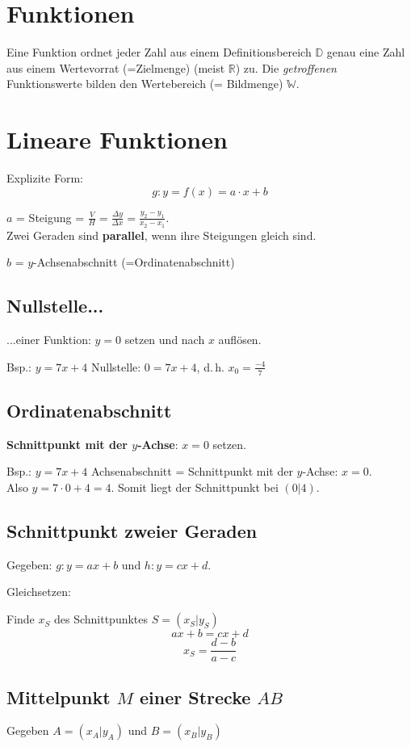 \begin{multicols}{2}
\hrulefill
\section{Funktionen}

Eine Funktion ordnet jeder Zahl aus einem Definitionsbereich
$\mathbb{D}$ genau eine Zahl aus einem Wertevorrat (=Zielmenge) (meist
$\mathbb{R}$)
zu. Die \textit{getroffenen} Funktionswerte bilden den Wertebereich
(= Bildmenge) $\mathbb{W}$.

\hrulefill
\section{Lineare Funktionen}
Explizite Form:
$$g: y = f(x) = a\cdot{}x + b$$

$a$ = Steigung = $\frac{V}{H}=\frac{\Delta y}{\Delta x} = \frac{y_2-y_1}{x_2-x_1}$.\\
Zwei Geraden sind \textbf{parallel}, wenn ihre Steigungen gleich sind.

$b$ = $y$-Achsenabschnitt (=Ordinatenabschnitt)


\subsection{Nullstelle...} ...einer Funktion: $y=0$ setzen und nach $x$
auf\/lösen.

Bsp.: $y=7x+4$ Nullstelle: $0 = 7x+4$, d.\,h. $x_0=\frac{-4}{7}$

\subsection{Ordinatenabschnitt}
\textbf{Schnittpunkt mit der $y$-Achse}: $x=0$ setzen.

Bsp.: $y=7x+4$ Achsenabschnitt = Schnittpunkt mit der $y$-Achse:
$x=0$.\\
Also $y=7\cdot{}0 + 4 = 4$. Somit liegt der Schnittpunkt bei $(0|4)$.


\subsection{Schnittpunkt zweier Geraden}
Gegeben: $g: y=ax+b$ und $h: y=cx+d$.

Gleichsetzen:

Finde $x_S$ des Schnittpunktes $S=(x_S|y_S)$
$$ax+b = cx+d$$
$$x_S = \frac{d-b}{a-c}$$
\subsection{Mittelpunkt $M$ einer Strecke $AB$}
Gegeben $A=(x_A|y_A)$ und $B=(x_B|y_B)$


\end{multicols}
